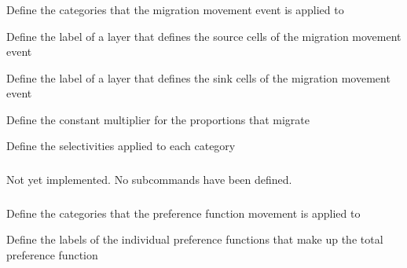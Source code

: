 \subsubsection[Migration movement]{}

 {Define the categories that the migration movement event is applied to}

 {Define the label of a layer that defines the source cells of the migration movement event}

 {Define the label of a layer that defines the sink cells of the migration movement event}

 {Define the constant multiplier for the proportions that migrate}

 {Define the selectivities applied to each category}

\subsubsection[Adjacent cell movement]{}

Not yet implemented. No subcommands have been defined.

\subsubsection[Preference movement]{}

 {Define the categories that the preference function movement is applied to}

 {Define the labels of the individual  preference functions that make up the total preference function}

